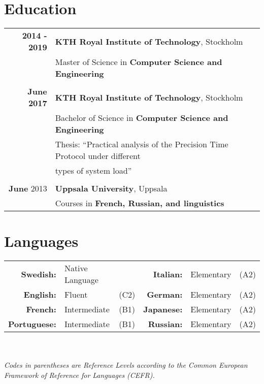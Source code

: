 \documentclass[a4paper,10pt]{article}
\begin{document}
\section{Education}
\begin{tabular}{r|l}
\textbf{2014 - 2019} & \textbf{KTH Royal Institute of Technology}, Stockholm\\
& Master of Science in \textbf{Computer Science and Engineering}\\&\\
\textbf{June 2017} & \textbf{KTH Royal Institute of Technology}, Stockholm \\& Bachelor of Science in \textbf{Computer Science and Engineering}\\ & \footnotesize{Thesis: ``Practical analysis of the Precision Time Protocol under different} \\& \footnotesize{types of system load''}\\ \\
\textbf{June} 2013& \textbf{Uppsala University}, Uppsala\\& Courses in \textbf{French, Russian, and linguistics}
\end{tabular}

\section{Languages}
\begin{tabular}{rll|rll}
\textbf{Swedish:}&Native Language&&
\textbf{Italian:}&Elementary&(A2)\\
\textbf{English:}&Fluent&(C2)&
\textbf{German:}&Elementary&(A2)\\
\textbf{French:}&Intermediate&(B1)&
\textbf{Japanese:}&Elementary&(A2)\\
\textbf{Portuguese:}&Intermediate&(B1)&
\textbf{Russian:}&Elementary&(A2)
\end{tabular}
\\ \\
\textit{Codes in parentheses are Reference Levels according to the Common European Framework of Reference for Languages (CEFR).}
\end{document}
